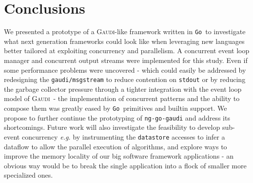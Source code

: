 \documentclass[a4paper]{jpconf}
\newcommand{\gaudi}{\textsc{Gaudi}}
\newcommand{\golang}{\texttt{Go}}
\begin{document}
\section{Conclusions}
We presented a prototype of a \gaudi-like framework written in
\golang\ to investigate what next generation frameworks could look
like when leveraging new languages better tailored at exploiting
concurrency and parallelism.
A concurrent event loop manager and concurrent output streams were
implemented for this study.
Even if some performance problems were uncovered - which could easily be 
addressed by redesigning the \texttt{gaudi/msgstream} to reduce
contention on \texttt{stdout} or by reducing the garbage collector
pressure through a tighter integration with the event loop model of
\gaudi\ - the implementation of concurrent patterns and the ability to
compose them was greatly eased by \golang\ primitives and builtin
support.
We propose to further continue the prototyping of \texttt{ng-go-gaudi}
and address its shortcomings.
Future work will also investigate the feasibility to develop sub-event
concurrency \emph{e.g.} by instrumenting the \texttt{datastore}
accesses to infer a dataflow to allow the parallel execution of algorithms,
and explore ways to improve the memory locality of our big software
framework applications - an obvious way would be to break the single
application into a flock of smaller more specialized ones.
\end{document}

